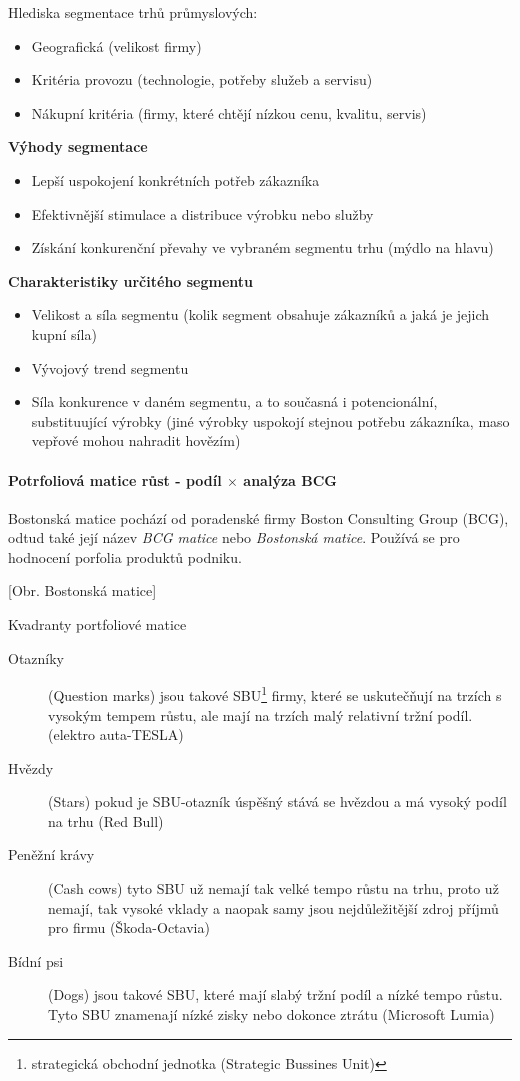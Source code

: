 Hlediska segmentace trhů průmyslových:
\begin{itemize}
    \item Geografická (velikost firmy)
    \item Kritéria provozu (technologie, potřeby služeb a servisu)
    \item Nákupní kritéria (firmy, které chtějí nízkou cenu, kvalitu, servis)
\end{itemize}

\textbf{Výhody segmentace}
\begin{itemize}
    \item Lepší uspokojení konkrétních potřeb zákazníka
    \item Efektivnější stimulace a distribuce výrobku nebo služby
    \item Získání konkurenční převahy ve vybraném segmentu trhu (mýdlo na hlavu)
\end{itemize}

\textbf{Charakteristiky určitého segmentu}
\begin{itemize}
    \item Velikost a síla segmentu (kolik segment obsahuje zákazníků a jaká je jejich kupní síla)
    \item Vývojový trend segmentu
    \item Síla konkurence v daném segmentu, a to současná i potencionální, substituující výrobky (jiné výrobky uspokojí stejnou potřebu zákazníka, maso vepřové mohou nahradit hovězím)
\end{itemize}

\paragraph*{Potrfoliová matice růst - podíl $\times$ analýza BCG}

Bostonská matice pochází od poradenské firmy Boston Consulting Group (BCG), odtud také její název \emph{BCG matice} nebo \emph{Bostonská matice}. Používá se pro hodnocení porfolia produktů podniku.

[Obr. Bostonská matice]

Kvadranty portfoliové matice
\begin{description}
    \item[Otazníky] (Question marks) jsou takové SBU\footnote{strategická obchodní jednotka (Strategic Bussines Unit)} firmy, které se uskutečňují na trzích s vysokým tempem růstu, ale mají na trzích malý relativní tržní podíl. (elektro auta-TESLA)
    \item[Hvězdy] (Stars) pokud je SBU-otazník úspěšný stává se hvězdou a má vysoký podíl na trhu (Red Bull)
    \item[Peněžní krávy] (Cash cows) tyto SBU už nemají tak velké tempo růstu na trhu, proto už nemají, tak vysoké vklady a naopak samy jsou nejdůležitější zdroj příjmů pro firmu (Škoda-Octavia)
    \item[Bídní psi] (Dogs) jsou takové SBU, které mají slabý tržní podíl a nízké tempo růstu. Tyto SBU znamenají nízké zisky nebo dokonce ztrátu (Microsoft Lumia)
\end{description}

